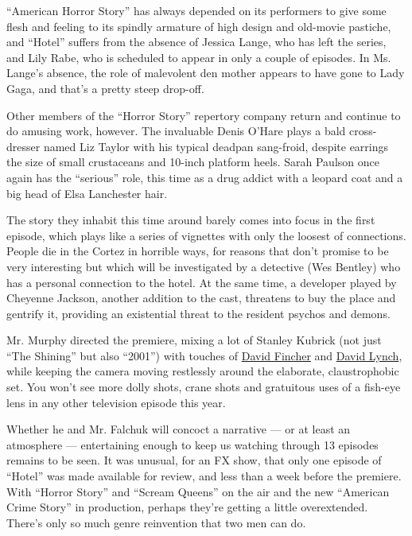 ``American Horror Story'' has always depended on its performers to give
some flesh and feeling to its spindly armature of high design and
old-movie pastiche, and ``Hotel'' suffers from the absence of Jessica
Lange, who has left the series, and Lily Rabe, who is scheduled to
appear in only a couple of episodes. In Ms. Lange's absence, the role of
malevolent den mother appears to have gone to Lady Gaga, and that's a
pretty steep drop-off.

Other members of the ``Horror Story'' repertory company return and
continue to do amusing work, however. The invaluable Denis O'Hare plays
a bald cross-dresser named Liz Taylor with his typical deadpan
sang-froid, despite earrings the size of small crustaceans and 10-inch
platform heels. Sarah Paulson once again has the ``serious'' role, this
time as a drug addict with a leopard coat and a big head of Elsa
Lanchester hair.

The story they inhabit this time around barely comes into focus in the
first episode, which plays like a series of vignettes with only the
loosest of connections. People die in the Cortez in horrible ways, for
reasons that don't promise to be very interesting but which will be
investigated by a detective (Wes Bentley) who has a personal connection
to the hotel. At the same time, a developer played by Cheyenne Jackson,
another addition to the cast, threatens to buy the place and gentrify
it, providing an existential threat to the resident psychos and demons.

Mr. Murphy directed the premiere, mixing a lot of Stanley Kubrick (not
just ``The Shining'' but also ``2001'') with touches of
\href{https://www.youtube.com/watch?v=znmZoVkCjpI}{David Fincher} and
\href{https://www.youtube.com/watch?v=KzdNrWmAV0E}{David Lynch}, while
keeping the camera moving restlessly around the elaborate,
claustrophobic set. You won't see more dolly shots, crane shots and
gratuitous uses of a fish-eye lens in any other television episode this
year.

Whether he and Mr. Falchuk will concoct a narrative --- or at least an
atmosphere --- entertaining enough to keep us watching through 13
episodes remains to be seen. It was unusual, for an FX show, that only
one episode of ``Hotel'' was made available for review, and less than a
week before the premiere. With ``Horror Story'' and ``Scream Queens'' on
the air and the new ``American Crime Story'' in production, perhaps
they're getting a little overextended. There's only so much genre
reinvention that two men can do.

